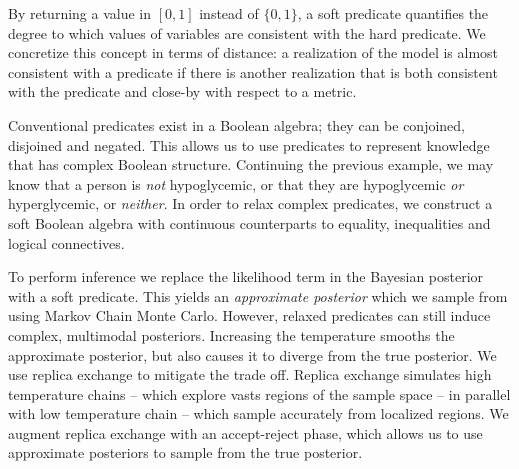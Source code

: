 By returning a value in $[0, 1]$ instead of $\{0, 1\}$, a soft predicate quantifies the degree to which values of variables are consistent with the hard predicate.
We concretize this concept in terms of distance: a realization of the model is almost consistent with a predicate if there is another realization that is both consistent with the predicate and close-by with respect to a metric.

Conventional predicates exist in a Boolean algebra; they can be conjoined, disjoined and negated.
This allows us to use predicates to represent knowledge that has complex Boolean structure.
Continuing the previous example, we may know that a person is \emph{not} hypoglycemic, or that they are hypoglycemic \emph{or} hyperglycemic, or \emph{neither}.
In order to relax complex predicates, we construct a soft Boolean algebra with continuous counterparts to equality, inequalities and logical connectives.

To perform inference we replace the likelihood term in the Bayesian posterior with a soft predicate.
This yields an \emph{approximate posterior} which we sample from using Markov Chain Monte Carlo.
However, relaxed predicates can still induce complex, multimodal posteriors.
Increasing the temperature smooths the approximate posterior, but also causes it to diverge from the true posterior.
We use replica exchange to mitigate the trade off. 
Replica exchange simulates high temperature chains -- which explore vasts regions of the sample space -- in parallel with low temperature chain -- which sample accurately from localized regions.
We augment replica exchange with an accept-reject phase, which allows us to use approximate posteriors to sample from the true posterior.




